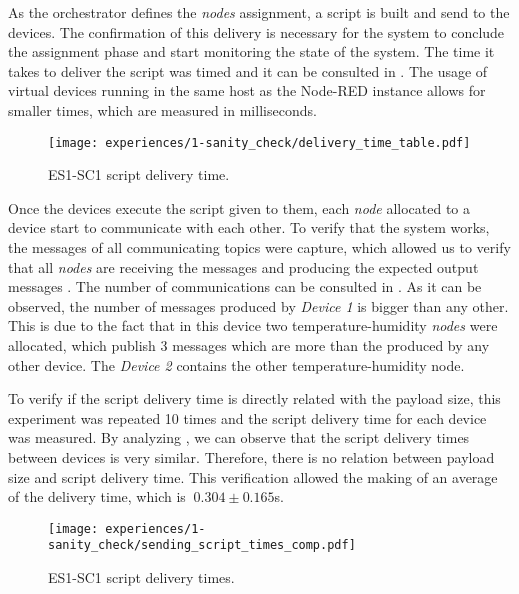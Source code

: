 As the orchestrator defines the \textit{nodes} assignment, a script is built and send to the devices. The confirmation of this delivery is necessary for the system to conclude the assignment phase and start monitoring the state of the system.  The time it takes to deliver the script was timed and it can be consulted in . The usage of virtual devices running in the same host as the Node-RED instance allows for smaller times, which are measured in milliseconds.

\begin{figure}[h]
\centering
\texttt{[image: experiences/1-sanity\_check/delivery\_time\_table.pdf]}
\caption[ES1-SC1 script delivery time.]{ES1-SC1 script delivery time.}\label{fig:sanity_check_delivery_time}
\end{figure}

Once the devices execute the script given to them, each \textit{node} allocated to a device start to communicate with each other. To verify that the system works, the messages of all communicating topics were capture, which allowed us to verify that all \textit{nodes} are receiving the messages and producing the expected output messages . The number of communications can be consulted in . As it can be observed, the number of messages produced by \textit{Device 1} is bigger than any other. This is due to the fact that in this device two temperature-humidity \textit{nodes} were allocated, which publish 3 messages which are more than the produced by any other device. The \textit{Device 2} contains the other temperature-humidity node.

To verify if the script delivery time is directly related with the payload size, this experiment was repeated 10 times and the script delivery time for each device was measured. By analyzing , we can observe that the script delivery times between devices is very similar. Therefore, there is no relation between payload size and script delivery time. This verification allowed the making of an average of the delivery time, which is $~0.304\pm0.165$s. 

\begin{figure}[h]
\centering
\texttt{[image: experiences/1-sanity\_check/sending\_script\_times\_comp.pdf]}
\caption[ES1-SC1 delivery times.]{ES1-SC1 script delivery times.}\label{fig:delivery_times_comp}
\end{figure}

